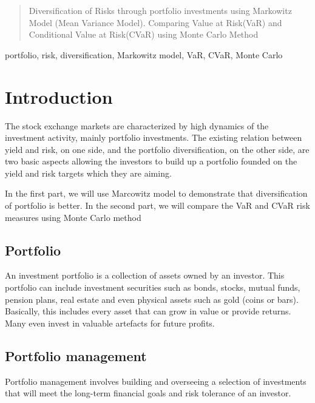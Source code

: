 \documentclass[conference]{IEEEtran}
\begin{document}
\maketitle


\begin{abstract}
Diversification of Risks through portfolio investments using Markowitz Model (Mean Variance Model).
\linebreak
Comparing Value at Risk(VaR) and Conditional Value at Risk(CVaR) using Monte Carlo Method
\end{abstract}

\begin{IEEEkeywords}
portfolio, risk, diversification, Markowitz model, VaR, CVaR, Monte Carlo
\end{IEEEkeywords}

\section{Introduction}
The stock exchange markets are characterized by high dynamics of the investment activity, mainly portfolio investments. The existing relation between yield and risk, on one side, and the portfolio diversification, on the other side, are two basic aspects allowing the investors to build up a portfolio founded on the yield and risk targets which they are aiming. 

In the first part, we will use Marcowitz model to demonstrate that diversification of portfolio is better. In the second part, we will compare the VaR and CVaR risk measures using Monte Carlo method

\subsection{Portfolio}
    An investment portfolio is a collection of assets owned by an investor. This portfolio can include investment securities such as bonds, stocks, mutual funds, pension plans, real estate and even physical assets such as gold (coins or bars). Basically, this includes every asset that can grow in value or provide returns. Many even invest in valuable artefacts for future profits.
    

\subsection{Portfolio management}
    Portfolio management involves building and overseeing a selection of investments that will meet the long-term financial goals and risk tolerance of an investor.
    
\end{document}
